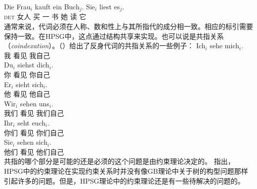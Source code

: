 \ea
\gll Die Frau$_i$ kauft ein Buch$_j$. Sie$_i$ liest es$_j$.\\
	  \textsc{det} 女人 买 一 书 她 读 它\\
\z
通常来说，代词必须在人称、数和性上与其所指代的成分相一致。相应的标引需要保持一致。在HPSG中，这点通过结构共享来实现。也可以说是共指关系（\textit{coindexation}）。（）给出了反身代词的共指关系的一些例子：
\eal
\ex
\gll Ich$_i$ sehe mich$_i$.\\
     我 看见 我自己\\
\ex 
\gll Du$_i$ siehst dich$_i$.\\
     你 看见 你自己\\
\ex 
\gll Er$_i$ sieht sich$_i$.\\
     他 看见 他自己\\
\ex 
\gll Wir$_i$ sehen uns$_i$.\\
     我们      看见   我们自己\\
\ex 
\gll Ihr$_i$ seht euch$_i$.\\
     你们 看见 你们自己\\
\ex 
\gll Sie$_i$ sehen sich$_i$.\\
     他们 看见 他们自己\\
\zl
共指的哪个部分是可能的还是必须的这个问题是由约束理论决定的。 \citet{PS92,ps2}指出，HPSG中的约束理论在实现约束关系时并没有像GB理论中关于树的构型问题那样引起许多的问题。但是，HPSG理论中的约束理论还是有一些待解决的问题的\citep[\S~20.4]{Mueller99a}。

